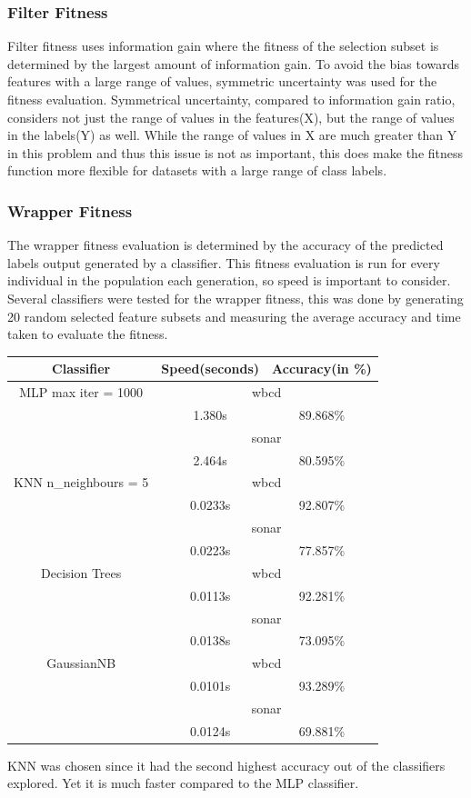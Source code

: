 \documentclass{article}
\begin{document}
\subsubsection*{Filter Fitness}
Filter fitness uses information gain where the fitness of the selection subset is determined by the largest amount of information gain. To avoid the bias towards features with a large range of values, symmetric uncertainty was used for the fitness evaluation. Symmetrical uncertainty, compared to information gain ratio, considers not just the range of values in the features(X), but the range of values in the labels(Y) as well. While the range of values in X are much greater than Y in this problem and thus this issue is not as important, this does make the fitness function more flexible for datasets with a large range of class labels. \par
\subsubsection*{Wrapper Fitness}
The wrapper fitness evaluation is determined by the accuracy of the predicted labels output generated by a classifier. This fitness evaluation is run for every individual in the population each generation, so speed is important to consider. Several classifiers were tested for the wrapper fitness, this was done by generating 20 random selected feature subsets and measuring the average accuracy and time taken to evaluate the fitness.  \par
\begin{center}
\begin{tabular}{|c|c|c|}
\hline
Classifier & Speed(seconds) & Accuracy(in \%)\\
\hline
MLP max iter = 1000 & \multicolumn{2}{c|}{wbcd} \\
\hline
& 1.380s & 89.868\% \\
\hline
& \multicolumn{2}{c|}{sonar} \\
\hline
 & 2.464s & 80.595\% \\
\hline
KNN n\_neighbours = 5 & \multicolumn{2}{c|}{wbcd} \\
& 0.0233s & 92.807\% \\
\hline
& \multicolumn{2}{c|}{sonar} \\
\hline
& 0.0223s & 77.857\% \\
\hline
Decision Trees & \multicolumn{2}{c|}{wbcd} \\
& 0.0113s & 92.281\% \\
\hline
& \multicolumn{2}{c|}{sonar} \\
\hline
& 0.0138s & 73.095\% \\
\hline
GaussianNB & \multicolumn{2}{c|}{wbcd} \\
& 0.0101s & 93.289\% \\
\hline
& \multicolumn{2}{c|}{sonar} \\
\hline
& 0.0124s & 69.881\% \\
\hline
\end{tabular}
\end{center}
KNN was chosen since it had the second highest accuracy out of the classifiers explored. Yet it is much faster compared to the MLP classifier. \par
\end{document}
